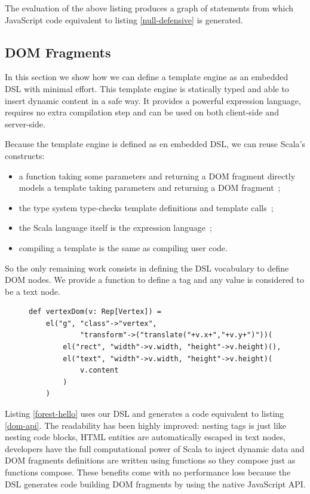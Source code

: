 \documentclass[preprint]{sigplanconf}
\begin{document}
The evaluation of the above listing produces a graph of statements from which JavaScript code equivalent to
listing \ref{null-defensive} is generated.

\subsection{DOM Fragments}

In this section we show how we can define a template engine as an embedded DSL with minimal effort. This template
engine is statically typed and able to insert dynamic content in a safe way. It provides a powerful expression
language, requires no extra compilation step and can be used on both client-side and server-side.

Because the template engine is defined as en embedded DSL, we can reuse Scala’s constructs:

\begin{itemize}
\item a function taking some parameters and returning a DOM fragment directly models a template taking parameters and
returning a DOM fragment~;
\item the type system type-checks template definitions and template calls~;
\item the Scala language itself is the expression language~;
\item compiling a template is the same as compiling user code.
\end{itemize}

So the only remaining work consists in defining the DSL vocabulary to define DOM nodes. We provide a 
function to define a tag and any  value is considered to be a text node.

\begin{figure}
\begin{lstlisting}[label=forest-hello,caption=DOM definition DSL]
def vertexDom(v: Rep[Vertex]) =
    el("g", "class"->"vertex",
            "transform"->("translate("+v.x+","+v.y+")"))(
        el("rect", "width"->v.width, "height"->v.height)(),
        el("text", "width"->v.width, "height"->v.height)(
            v.content
        )
    )
\end{lstlisting}
\end{figure}

Listing \ref{forest-hello} uses our DSL and generates a code equivalent to listing \ref{dom-api}. The readability has
been highly improved: nesting tags is just like nesting code blocks, HTML entities are
automatically escaped in text nodes, developers have the full computational power of Scala to inject dynamic data and
DOM fragments definitions are written using functions so they compose just as functions compose. These benefits come
with no performance loss because the DSL generates code building DOM fragments by using the native JavaScript API.
\end{document}
